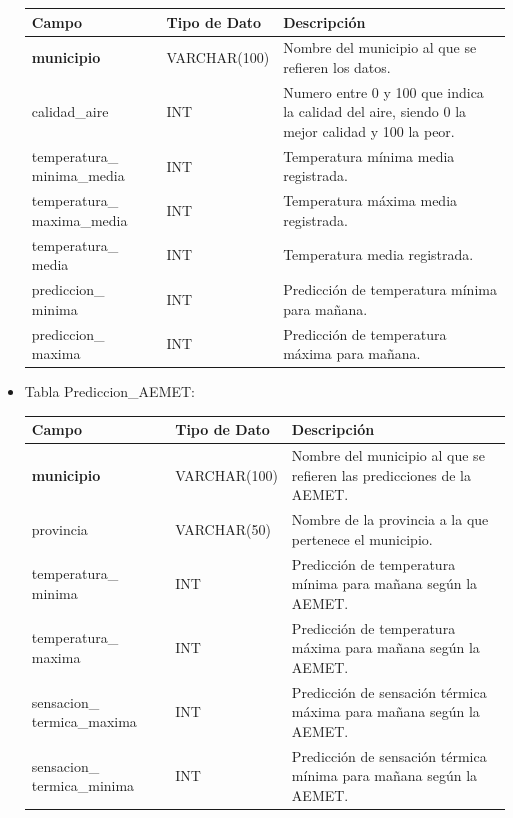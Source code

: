 \documentclass[12pt, a4paper]{article}
\begin{document}
\begin{itemize}
\begin{center}
\begin{tabular}{|p{}|p{}|p{}|}
    \hline
    \textbf{Campo} & \textbf{Tipo de Dato} & \textbf{Descripción} \\
    \hline
    \textbf{municipio} & VARCHAR(100) & Nombre del municipio al que se refieren los datos. \\
    calidad\_aire & INT & Numero entre 0 y 100 que indica la calidad del aire, siendo 0 la mejor calidad y 100 la peor. \\
    temperatura\_ minima\_media & INT & Temperatura mínima media registrada. \\
    temperatura\_ maxima\_media & INT & Temperatura máxima media registrada. \\
    temperatura\_ media & INT & Temperatura media registrada. \\
    prediccion\_ minima & INT & Predicción de temperatura mínima para mañana. \\
    prediccion\_ maxima & INT & Predicción de temperatura máxima para mañana. \\
    \hline
\end{tabular}
\end{center}

\item Tabla Prediccion\_AEMET:

\begin{center}
\begin{tabular}{|p{}|p{}|p{}|}
    \hline
    \textbf{Campo} & \textbf{Tipo de Dato} & \textbf{Descripción} \\
    \hline
    \textbf{municipio} & VARCHAR(100) & Nombre del municipio al que se refieren las predicciones de la AEMET. \\
    provincia & VARCHAR(50) & Nombre de la provincia a la que pertenece el municipio. \\
    temperatura\_ minima & INT & Predicción de temperatura mínima para mañana según la AEMET. \\
    temperatura\_ maxima & INT & Predicción de temperatura máxima para mañana según la AEMET. \\
    sensacion\_ termica\_maxima & INT & Predicción de sensación térmica máxima para mañana según la AEMET. \\
    sensacion\_ termica\_minima & INT & Predicción de sensación térmica mínima para mañana según la AEMET. \\
    \hline
\end{tabular}
\end{center}


\end{itemize}
\end{document}
